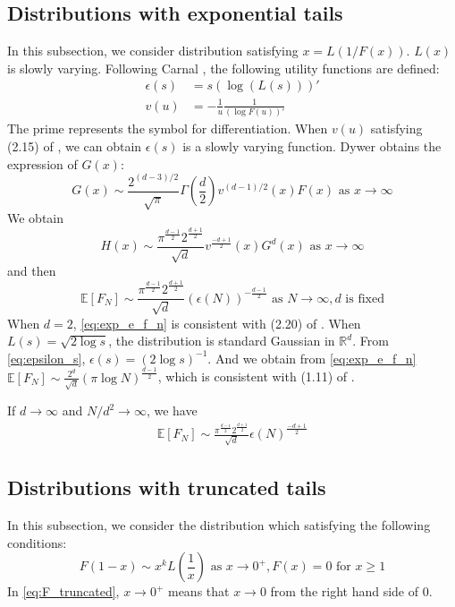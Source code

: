 \documentclass{aptpub}
\def\E{\mathbb{E}}
\def\R{\mathbb{R}}
\begin{document}
\subsection{Distributions with exponential tails}
In this subsection, we consider distribution satisfying
$x = L(1/F(x)) $. $L(x)$ is slowly varying. Following Carnal \cite{carnal1970konvexe},
the following utility functions are defined:
\begin{align}
     \epsilon(s) & = s (\log (L(s)))' \label{eq:epsilon_s}\\
     v(u) &= -\frac{1}{u} \frac{1}{(\log F(u))'}    
\end{align}
The prime represents the symbol for differentiation. When $v(u)$ satisfying
(2.15) of \cite{carnal1970konvexe},
we can obtain $\epsilon(s)$ is a slowly varying function.
Dywer \cite{dwyer1991convex} obtains the expression of $G(x)$:
\begin{equation}\label{eq:G_x_exp}
     G(x) \sim \frac{2^{(d-3)/2}}{\sqrt{\pi}}\Gamma(\frac{d}{2}) v^{(d-1)/2}(x) F(x)
      \textrm{ as } x\to \infty
\end{equation}
We obtain 
\begin{equation}\label{eq:H_x_exp}
     H(x) \sim \frac{\pi^{\frac{d-1}{2}} 2^{\frac{d+1}{2}}}{\sqrt{d}}v^{\frac{-d+1}{2}}(x)G^d(x)
     \textrm{ as } x\to \infty
\end{equation}
 and then
 \begin{equation}\label{eq:exp_e_f_n}
     \E[F_N]\sim \frac{\pi^{\frac{d-1}{2}} 2^{\frac{d+1}{2}}}{\sqrt{d}} (\epsilon(N))^{-\frac{d-1}{2}}
     \textrm{ as } N \to \infty, d \textrm { is fixed}
 \end{equation}
 When $d=2$, \eqref{eq:exp_e_f_n} is consistent with (2.20) of \cite{carnal1970konvexe}.
 When $L(s)=\sqrt{2\log s}$, the distribution is standard Gaussian in $\R^d$.
 From \eqref{eq:epsilon_s}, $\epsilon(s) = (2\log s)^{-1}$. And we obtain from \eqref{eq:exp_e_f_n}
 $\E[F_N]\sim \frac{2^d}{\sqrt{d}}(\pi \log N)^{\frac{d-1}{2}}$,
 which is consistent with (1.11) of \cite{raynaud1970enveloppe}.

 If $d\to\infty$ and $N/d^2\to \infty$, we have
\begin{align}\label{eq:d_infty_exp_E_F_N}
      \E[F_N]\sim \frac{\pi^{\frac{d-1}{2}} 2^{\frac{d+1}{2}}}{\sqrt{d}} \epsilon(N)^{\frac{-d+1}{2}}
\end{align}
\subsection{Distributions with truncated tails}
In this subsection, we consider the distribution which satisfying the following conditions:
\begin{equation}\label{eq:F_truncated}
     F(1-x) \sim x^k L(\frac{1}{x})  \text{ as } x \to 0^+,
     F(x) = 0 \text{ for } x \geq 1
\end{equation}
In \eqref{eq:F_truncated}, $x \to 0^+$ means that $x\to 0$ from the right hand side of $0$.
\end{document}
